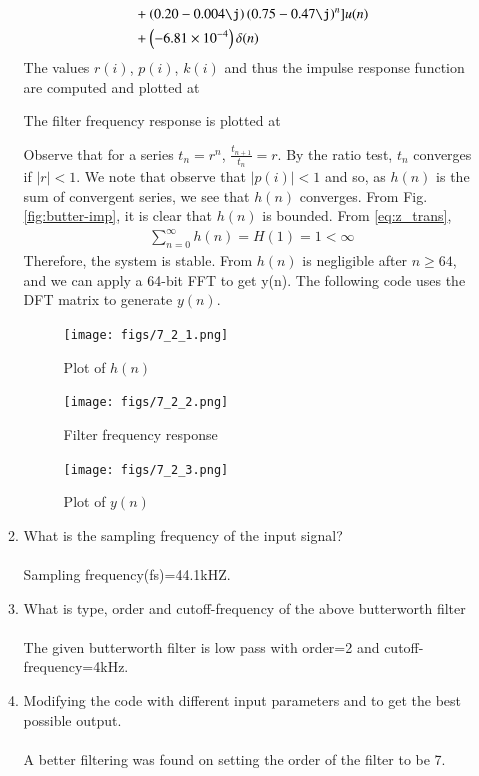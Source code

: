 \documentclass[journal,12pt,twocolumn]{IEEEtran}
\renewcommand\thesection{\arabic{section}}
\begin{document}
\begin{enumerate}[label=\thesection.\arabic*]
\begin{enumerate}[label=\thesection.\arabic*]
\begin{align}
		 &+ \brak{0.20-0.004\j}\brak{0.75-0.47\j}^n]u(n) \nonumber \\
		 &+ \brak{-6.81 \times 10^{-4}}\delta(n)
	 \end{align}
	 The values $r(i)$, $p(i)$, $k(i)$ and thus the impulse response function are computed and plotted at
	 
	 The filter frequency response is plotted at
	 
	 Observe that for a series $t_n = r^n$, $\frac{t_{n + 1}}{t_n} = r$.
	 By the ratio test, $t_n$ converges if $|r| < 1$. We note that
	 observe that $|p(i)| < 1$ and so, as $h(n)$ is the sum of convergent series,
	 we see that $h(n)$ converges. From Fig. \eqref{fig:butter-imp}, it is clear
	 that $h(n)$ is bounded. From \eqref{eq:z_trans},
	 \begin{align}
		 \sum_{n = 0}^{\infty}h(n) = H(1) = 1 < \infty
	 \end{align}
	 Therefore, the system is stable. From
	 $h(n)$ is negligible after $n \geq 64$, and we
	 can apply a 64-bit FFT to get y(n). The following code uses the DFT matrix
	 to generate $y(n)$.
	 
	 \begin{figure}[!htb]
		 \texttt{[image: figs/7\_2\_1.png]}
		 \caption{Plot of $h(n)$}
		 \label{fig:butter-imp}
	 \end{figure}
	 \begin{figure}[!htb]
		 \texttt{[image: figs/7\_2\_2.png]}
		 \caption{Filter frequency response}
		 \label{fig:butter-resp}
	 \end{figure}
	 \begin{figure}[!htb]
		 \texttt{[image: figs/7\_2\_3.png]}
		 \caption{Plot of $y(n)$}
		 \label{fig:butter-out}
	 \end{figure}
	 \item What is the sampling frequency of the input signal?
	 \\\solution\\
	 Sampling frequency(fs)=44.1kHZ.
	 \item
	 What is type, order and  cutoff-frequency of the above butterworth filter
	 \\\solution\\
	 The given butterworth filter is low pass with order=2 and cutoff-frequency=4kHz.
	 \item
	 Modifying the code with different input parameters and to get the best possible output.
	 \\\solution\\
	 A better filtering was found on setting the order of the filter to be 7.
	 \end{enumerate}
 \end{enumerate}
\end{document}
